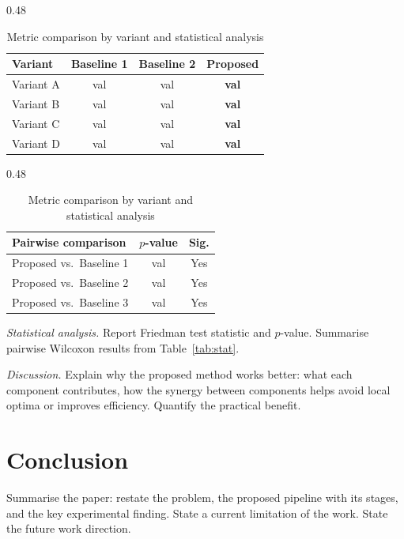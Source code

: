 \documentclass[a4paper,fleqn]{cas-dc}
\begin{document}
\begin{table}[width=\linewidth,cols=4,pos=htbp]
\centering

\begin{subtable}[t]{0.48\linewidth}
\centering
\small
\begin{tabular}{lccc}
\toprule
Variant & Baseline 1 & Baseline 2 & \textbf{Proposed} \\
\midrule
Variant A & val & val & \textbf{val} \\
Variant B & val & val & \textbf{val} \\
Variant C & val & val & \textbf{val} \\
Variant D & val & val & \textbf{val} \\
\bottomrule
\end{tabular}
\caption{Metric comparison by variant}
\label{tab:variant_results}
\end{subtable}
\hfill
\begin{subtable}[t]{0.48\linewidth}
\centering
\small
\begin{tabular}{lcc}
\toprule
Pairwise comparison & $p$-value & Sig. \\
\midrule
Proposed vs.\ Baseline 1 & val & Yes \\
Proposed vs.\ Baseline 2 & val & Yes \\
Proposed vs.\ Baseline 3 & val & Yes \\
\bottomrule
\end{tabular}
\caption{Statistical significance analysis}
\label{tab:stat}
\end{subtable}

\caption{Metric comparison by variant and statistical analysis}
\label{tab:combined}
\end{table}

\textit{Statistical analysis.}
Report Friedman test statistic and $p$-value. Summarise pairwise Wilcoxon results from Table~\ref{tab:stat}.

\textit{Discussion.}
Explain why the proposed method works better: what each component contributes, how the synergy between components helps avoid local optima or improves efficiency. Quantify the practical benefit.

\section{Conclusion}\label{sec:conclusion}

Summarise the paper: restate the problem, the proposed pipeline with its stages, and the key experimental finding. State a current limitation of the work. State the future work direction.
\end{document}
